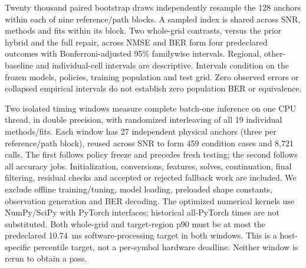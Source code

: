 Twenty thousand paired bootstrap draws independently resample the 128 anchors within each of nine reference/path blocks. A sampled index is shared across SNR, methods and fits within its block. Two whole-grid contrasts, versus the prior hybrid and the full repair, across NMSE and BER form four predeclared outcomes with Bonferroni-adjusted 95\% familywise intervals. Regional, other-baseline and individual-cell intervals are descriptive. Intervals condition on the frozen models, policies, training population and test grid. Zero observed errors or collapsed empirical intervals do not establish zero population BER or equivalence.

Two isolated timing windows measure complete batch-one inference on one CPU thread, in double precision, with randomized interleaving of all 19 individual methods/fits. Each window has 27 independent physical anchors (three per reference/path block), reused across SNR to form 459 condition cases and 8,721 calls. The first follows policy freeze and precedes fresh testing; the second follows all accuracy jobs. Initialization, conversions, features, solves, continuation, final filtering, residual checks and accepted or rejected fallback work are included. We exclude offline training/tuning, model loading, preloaded shape constants, observation generation and BER decoding. The optimized numerical kernels use NumPy/SciPy with PyTorch interfaces; historical all-PyTorch times are not substituted. Both whole-grid and target-region p90 must be at most the predeclared 10.74~ms software-processing target in both windows. This is a host-specific percentile target, not a per-symbol hardware deadline. Neither window is rerun to obtain a pass.
